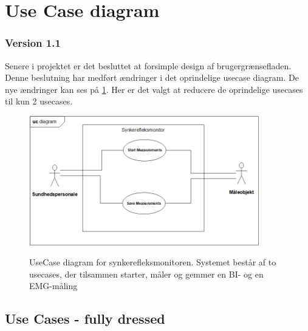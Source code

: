 \section{Use Case diagram }
\subsubsection{Version 1.1} 
Senere i projektet er det besluttet at forsimple design af brugergrænsefladen. Denne beslutning har medført ændringer i det oprindelige usecase diagram. De nye ændringer kan ses på \ref{UseCasediagramV1.1}. Her er det valgt at reducere de oprindelige usecases til kun 2 usecases. 

\begin{figure}[H]
\centering
{\includegraphics[width=10cm]
{Figure/usecasediagram}}
\caption{UseCase diagram for synkerefleksmonitoren. Systemet består af to usecases, der tilsammen starter, måler og gemmer en BI- og en EMG-måling}
\label{UseCasediagramV1.1}
\end{figure}


\subsection{Use Cases - fully dressed}

